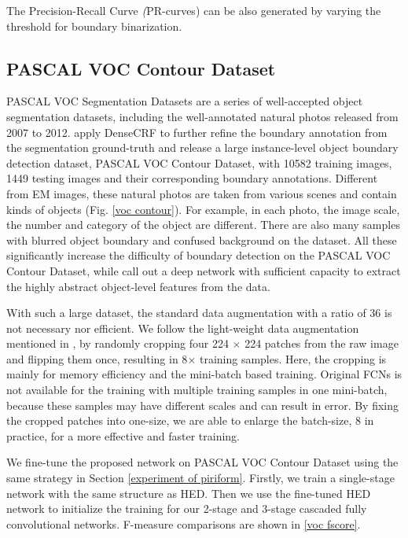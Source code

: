 \documentclass[senior]{IPSstyle}
\begin{document}
The Precision-Recall Curve \emph(PR-curves) can be also generated by varying the threshold for boundary binarization\cite{Shen2016CVPR}.

\subsection{PASCAL VOC Contour Dataset}
PASCAL VOC Segmentation Datasets are a series of well-accepted object segmentation datasets,  including the well-annotated natural photos released from 2007 to 2012. \cite{Yang2016} apply DenseCRF\cite{Krahenbuhl2011} to further refine the boundary annotation from the segmentation ground-truth and release a large instance-level object boundary detection dataset, PASCAL VOC Contour Dataset, with 10582 training images, 1449 testing images and their corresponding boundary annotations. Different from EM images, these natural photos are taken from various scenes and contain kinds of objects (Fig. \ref{voc contour}). For example, in each photo, the image scale, the number and category of the object are different. There are also many samples with blurred object boundary and confused background on the dataset. All these significantly increase the difficulty of boundary detection on the PASCAL VOC Contour Dataset, while call out a deep network with sufficient capacity to extract the highly abstract object-level features from the data.

With such a large dataset, the standard data augmentation with a ratio of 36 is not necessary nor efficient. We follow the light-weight data augmentation mentioned in \cite{Yang2016}, by randomly cropping four 224 \(\times\) 224 patches from the raw image and flipping them once, resulting in 8\(\times\) training samples. Here, the cropping is mainly for memory efficiency\cite{Yang2016} and the mini-batch based training. Original FCNs\cite{Long2015} is not available for the training with multiple training samples in one mini-batch, because these samples may have different scales and can result in error. By fixing the cropped patches into one-size, we are able to enlarge the batch-size, 8 in practice, for a more effective and faster training.

We fine-tune the proposed network on PASCAL VOC Contour Dataset using the same strategy in Section \ref{experiment of piriform}. Firstly, we train a single-stage network with the same structure as HED\cite{Xie2015}. Then we use the fine-tuned HED network to initialize the training for our 2-stage and 3-stage cascaded fully convolutional networks. F-measure comparisons are shown in \ref{voc fscore}. 
\end{document}
